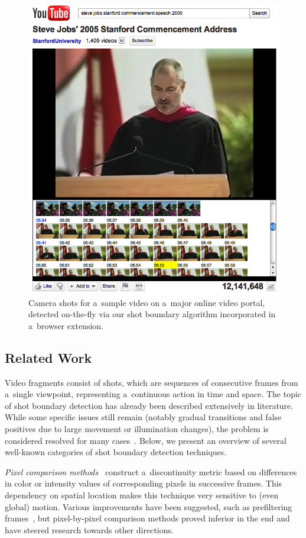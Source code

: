 \begin{figure}
  \begin{center}
    \includegraphics[width=0.7\linewidth]{./stevejobs.png}
  \end{center}
  \caption[Camera shots for a~sample video on  
    a~major online video portal]
    {Camera shots for a~sample video on 
    a~major online video portal, detected on-the-fly via
    our shot boundary algorithm incorporated
    in a~browser extension.}
  \label{fig:screenshot}
\end{figure}

\subsection{Related Work} \label{sec:related-work}
Video fragments consist of shots, which are sequences of
consecutive frames from a~single viewpoint,
representing a~continuous action in time and space.
The topic of shot boundary detection has already been described
extensively in literature.
While some specific issues still remain
(notably gradual transitions and false positives
due to large movement or illumination changes),
the problem is considered resolved for many
cases~\cite{yuan2007shotboundary,hanjalic2002shotboundary}.
Below, we present an overview of several well-known categories of shot boundary detection techniques.

\emph{Pixel comparison
methods}~\cite{hampapur1994videosegmentation,
zhang1993videopartitioning} construct a~discontinuity metric
based on differences in color or intensity values
of corresponding pixels in successive frames.
This dependency on spatial location makes this technique
very sensitive to (even global) motion.
Various improvements have been suggested, such as prefiltering
frames~\cite{zhang1995videoparsing},
but pixel-by-pixel comparison methods proved inferior in the end
and have steered research towards other directions.

